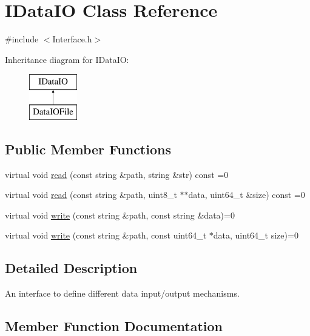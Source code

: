 \hypertarget{class_i_data_i_o}{}\section{I\+Data\+I\+O Class Reference}
\label{class_i_data_i_o}


{\ttfamily \#include $<$Interface.\+h$>$}

Inheritance diagram for I\+Data\+I\+O\+:\begin{figure}[H]
\begin{center}
\leavevmode
\includegraphics[height=2.000000cm]{class_i_data_i_o}
\end{center}
\end{figure}
\subsection*{Public Member Functions}
\begin{DoxyCompactItemize}
\item 
virtual void \hyperlink{class_i_data_i_o_ad684b0650c9cd79e7cf88b3a9d7aac38}{read} (const string \&path, string \&str) const  =0
\item 
virtual void \hyperlink{class_i_data_i_o_a81cee30c9e14d84e55734955e8c443dc}{read} (const string \&path, uint8\+\_\+t $\ast$$\ast$data, uint64\+\_\+t \&size) const  =0
\item 
virtual void \hyperlink{class_i_data_i_o_a9fe10ce1e824e755729e8dee2fd85d51}{write} (const string \&path, const string \&data)=0
\item 
virtual void \hyperlink{class_i_data_i_o_a451893a6dc454a695f0cb81a366e11a2}{write} (const string \&path, const uint64\+\_\+t $\ast$data, uint64\+\_\+t size)=0
\end{DoxyCompactItemize}


\subsection{Detailed Description}
An interface to define different data input/output mechanisms. 

\subsection{Member Function Documentation}
\hypertarget{class_i_data_i_o_ad684b0650c9cd79e7cf88b3a9d7aac38}{}
